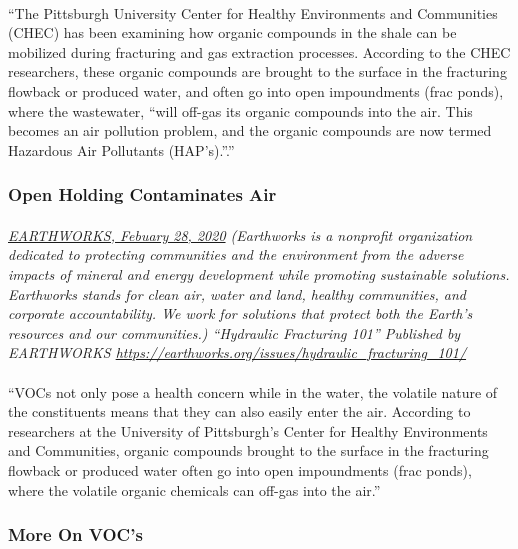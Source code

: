 \documentclass{article}
\begin{document}
\paragraph{}
``The Pittsburgh University Center for Healthy Environments and Communities (CHEC) has been examining how organic compounds in the shale can be mobilized during fracturing and gas extraction processes. According to the CHEC researchers, these organic compounds are brought to the surface in the fracturing flowback or produced water, and often go into open impoundments (frac ponds), where the wastewater, “will off-gas its organic compounds into the air. This becomes an air pollution problem, and the organic compounds are now termed Hazardous Air Pollutants (HAP’s).”.''

\subsubsection{Open Holding Contaminates Air}
\paragraph{}
\small
\textit{
\underline{EARTHWORKS, Febuary 28, 2020}
(Earthworks is a nonprofit organization dedicated to protecting communities and the environment from the adverse impacts of mineral and energy development while promoting sustainable solutions. Earthworks stands for clean air, water and land, healthy communities, and corporate accountability. We work for solutions that protect both the Earth’s resources and our communities.) “Hydraulic Fracturing 101” Published by EARTHWORKS 
\url{https://earthworks.org/issues/hydraulic_fracturing_101/}}
\normalsize

\paragraph{}
``VOCs not only pose a health concern while in the water, the volatile nature of the constituents means that they can also easily enter the air. According to researchers at the  University of Pittsburgh’s Center for Healthy Environments and Communities, organic compounds brought to the surface in the fracturing flowback or produced water often go into open impoundments (frac ponds), where the volatile organic chemicals can off-gas into the air.''

\subsubsection{More On VOC's}
\end{document}

